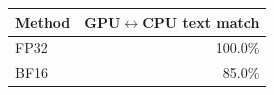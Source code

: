 \begin{tabular}{lr}
\toprule
Method & GPU$\leftrightarrow$CPU text match \\
\midrule
FP32 & 100.0\% \\
BF16 & 85.0\% \\
\bottomrule
\end{tabular}
